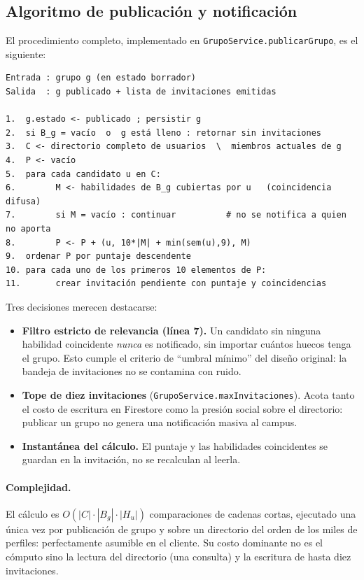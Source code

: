 \documentclass[12pt,a4paper]{article}
\begin{document}
\subsection{Algoritmo de publicación y notificación}
El procedimiento completo, implementado en \texttt{GrupoService.publicarGrupo}, es el siguiente:

\begin{verbatim}
Entrada : grupo g (en estado borrador)
Salida  : g publicado + lista de invitaciones emitidas

1.  g.estado <- publicado ; persistir g
2.  si B_g = vacío  o  g está lleno : retornar sin invitaciones
3.  C <- directorio completo de usuarios  \  miembros actuales de g
4.  P <- vacío
5.  para cada candidato u en C:
6.        M <- habilidades de B_g cubiertas por u   (coincidencia difusa)
7.        si M = vacío : continuar          # no se notifica a quien no aporta
8.        P <- P + (u, 10*|M| + min(sem(u),9), M)
9.  ordenar P por puntaje descendente
10. para cada uno de los primeros 10 elementos de P:
11.       crear invitación pendiente con puntaje y coincidencias
\end{verbatim}

Tres decisiones merecen destacarse:

\begin{itemize}
    \item \textbf{Filtro estricto de relevancia (línea 7).} Un candidato sin ninguna habilidad coincidente \emph{nunca} es notificado, sin importar cuántos huecos tenga el grupo. Esto cumple el criterio de ``umbral mínimo'' del diseño original: la bandeja de invitaciones no se contamina con ruido.
    \item \textbf{Tope de diez invitaciones} (\texttt{GrupoService.maxInvitaciones}). Acota tanto el costo de escritura en Firestore como la presión social sobre el directorio: publicar un grupo no genera una notificación masiva al campus.
    \item \textbf{Instantánea del cálculo.} El puntaje y las habilidades coincidentes se guardan en la invitación, no se recalculan al leerla.
\end{itemize}

\paragraph{Complejidad.} El cálculo es $O(|C| \cdot |B_g| \cdot |H_u|)$ comparaciones de cadenas cortas, ejecutado una única vez por publicación de grupo y sobre un directorio del orden de los miles de perfiles: perfectamente asumible en el cliente. Su costo dominante no es el cómputo sino la lectura del directorio (una consulta) y la escritura de hasta diez invitaciones.
\end{document}
